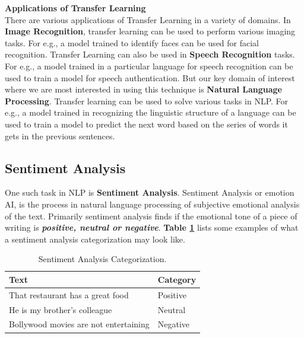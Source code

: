 \documentclass[a4paper, 12pt]{article}
\begin{document}
\begin{sloppypar}
\large \textbf{Applications of Transfer Learning} \\ [0.5ex]
\normalsize
There are various applications of Transfer Learning in a variety of domains. In \textbf{Image Recognition}, transfer learning can be used to perform various imaging tasks. For e.g.,  a model trained to identify faces can be used for facial recognition. Transfer Learning can also be used in \textbf{Speech Recognition} tasks.  For e.g., a model trained in a particular language for speech recognition can be used to train a model for speech authentication. But our key domain of interest where we are most interested in using this technique is \textbf{Natural Language Processing}. Transfer learning can be used to solve various tasks in  NLP. For e.g., a model trained in recognizing the linguistic structure of a language can be used to train a model to predict the next word based on the series of words it gets in the previous sentences.

\subsection{Sentiment Analysis}
One such task in NLP is \textbf{Sentiment Analysis}. Sentiment Analysis or emotion AI, is the process in natural language processing  of subjective emotional analysis of the text. Primarily sentiment analysis finds if the emotional tone of a piece of writing is \textbf{\textit{positive, neutral or negative}}. \textbf{Table \ref{table: category}} lists some examples of what a sentiment analysis categorization may look like.
\begin{table}[H]
\caption{ Sentiment Analysis Categorization.\label{table: category}}

\begin{tabularx}{\columnwidth}{| X | X |}
\hline
Text & Category \\ [0.5ex]
\hline
\hline
That restaurant has a great food & Positive \\ [0.5ex]
\hline
He is my brother's colleague & Neutral \\ [0.5ex]
\hline
Bollywood movies are not entertaining & Negative \\ [0.5ex]
\hline
\end{tabularx}
\end{table}


\end{sloppypar}
\end{document}

